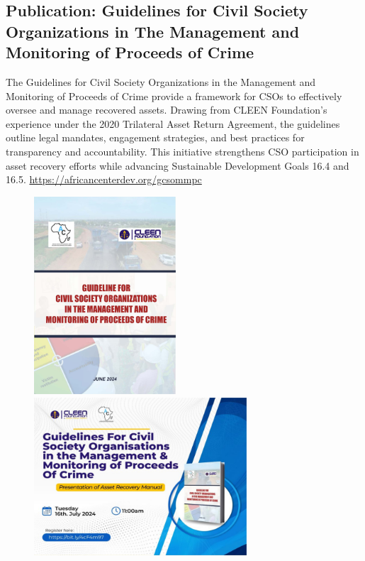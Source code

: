 \documentclass[
  letterpaper,
  DIV=11,
  numbers=noendperiod]{scrreprt}
\begin{document}
\subsection{Publication: Guidelines for Civil Society Organizations in
The Management and Monitoring of Proceeds of
Crime}\label{publication-guidelines-for-civil-society-organizations-in-the-management-and-monitoring-of-proceeds-of-crime}

The Guidelines for Civil Society Organizations in the Management and
Monitoring of Proceeds of Crime provide a framework for CSOs to
effectively oversee and manage recovered assets. Drawing from CLEEN
Foundation's experience under the 2020 Trilateral Asset Return
Agreement, the guidelines outline legal mandates, engagement strategies,
and best practices for transparency and accountability. This initiative
strengthens CSO participation in asset recovery efforts while advancing
Sustainable Development Goals 16.4 and 16.5.
\url{https://africancenterdev.org/gcsommpc}

\begin{figure}

\begin{minipage}{0.40\linewidth}
\begin{center}
\includegraphics[width=2.08333in,height=\textheight,keepaspectratio]{images/return/06_01_pub.png}
\end{center}
\end{minipage}%
%
\begin{minipage}{0.60\linewidth}
\begin{center}
\includegraphics[width=3.125in,height=\textheight,keepaspectratio]{images/return/06_02_pub.png}
\end{center}
\end{minipage}%

\end{figure}%
\end{document}
